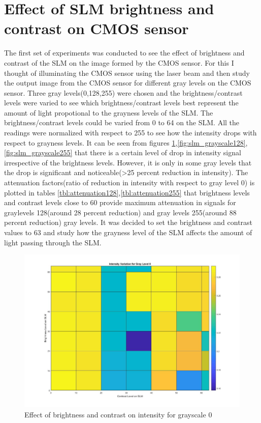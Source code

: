\section{Effect of SLM brightness and contrast on CMOS sensor}
The first set of experiments was conducted to see the effect of brightness and contrast of the SLM on the image formed by the CMOS sensor. For this I thought of illuminating the CMOS sensor using the laser beam and then study the output image from the CMOS sensor for different gray levels on the CMOS sensor. Three gray levels(0,128,255) were chosen and the brightness/contrast levels were varied to see which brightness/contrast levels best represent the amount of light propotional to the grayness levels of the SLM. The brightness/contrast levels could be varied from 0 to 64 on the SLM. All the readings were normalized with respect to 255 to see how the intensity drops with respect to grayness levels. It can be seen from figures \ref{fig:slm_grayscale0},\ref{fig:slm_grayscale128},\ref{fig:slm_grayscale255} that there is a certain level of drop in intensity signal irrespective of the brightness levels. However, it is only in some gray levels that the drop is significant and noticeable(>25 percent reduction in intensity). The attenuation factors(ratio of reduction in intensity with respect to gray level 0) is plotted in tables \ref{tbl:attenuation128},\ref{tbl:attenuation255} that brightness levels and contrast levels close to 60 provide maximum attenuation in signals for graylevels 128(around 28 percent reduction) and gray levels 255(around 88 percent reduction) gray levels. It was decided to set the brightness and contrast values to 63 and study how the grayness level of the SLM affects the amount of light passing through the SLM.
\begin{figure}[h]
\centering
\includegraphics[scale=0.35]{pics/slm/slmgrayscale0.jpg}
\caption{Effect of brightness and contrast on intensity for grayscale 0}
\label{fig:slm_grayscale0}
\end{figure}
